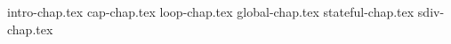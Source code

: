\documentclass[degree=doctor,bibtype=numeric,degreetype=academic]{tongjithesis}
\begin{document}


\frontmatter

\makecover


\tableofcontents
% 

\listoffigures
\listoftables

\mainmatter
{intro-chap.tex}
{cap-chap.tex}
{loop-chap.tex}
{global-chap.tex}
{stateful-chap.tex}
{sdiv-chap.tex}





\backmatter

\begin{acknowledgement}

\end{acknowledgement}

\printTJbibliography


\begin{appendix}
% 
\end{appendix}

\begin{resume}

\end{resume}
\end{document}

